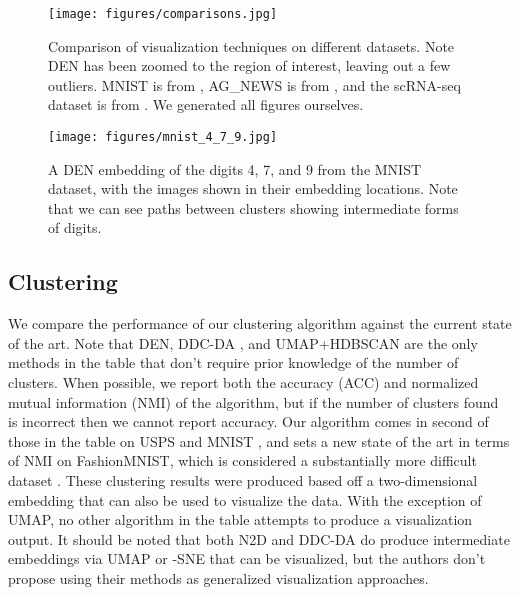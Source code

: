 \documentclass{article}
\begin{document}
\begin{figure}[]
    \centering
    \texttt{[image: figures/comparisons.jpg]}
    \caption{Comparison of visualization techniques on different datasets. Note DEN has been zoomed to the region of interest, leaving out a few outliers. MNIST is from \cite{lecun1998gradient}, AG\_NEWS is from \cite{gulli}, and the scRNA-seq dataset is from \cite{shekhar2016comprehensive}. We generated all figures ourselves.}
    \label{fig:labeled_vis_comparisons}
\end{figure}

\begin{figure}[]
    \centering
    \texttt{[image: figures/mnist\_4\_7\_9.jpg]}
    \caption{A DEN embedding of the digits 4, 7, and 9 from the MNIST dataset, with the images shown in their embedding locations. Note that we can see paths between clusters showing intermediate forms of digits.}
    \label{fig:mnist_embedding}
\end{figure}

\subsection{Clustering}

We compare the performance of our clustering algorithm against the current state of the art. Note that DEN, DDC-DA \cite{ren2020deep}, and UMAP+HDBSCAN are the only methods in the table that don't require prior knowledge of the number of clusters. When possible, we report both the accuracy (ACC) and normalized mutual information (NMI) of the algorithm, but if the number of clusters found is incorrect then we cannot report accuracy. Our algorithm comes in second of those in the table on USPS \cite{hull1994database} and MNIST \cite{lecun1998gradient}, and sets a new state of the art in terms of NMI on FashionMNIST, which is considered a substantially more difficult dataset \cite{xiao2017fashion}. These clustering results were produced based off a two-dimensional embedding that can also be used to visualize the data. With the exception of UMAP, no other algorithm in the table attempts to produce a visualization output. It should be noted that both N2D and DDC-DA do produce intermediate embeddings via UMAP or -SNE that can be visualized, but the authors don't propose using their methods as generalized visualization approaches.
\end{document}
